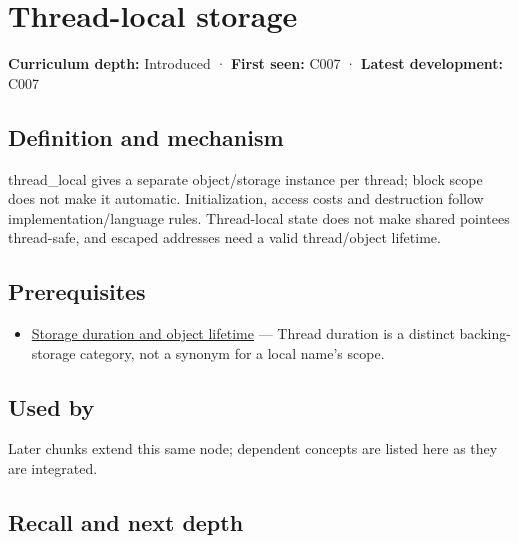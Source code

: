 \hypertarget{appendix-3b88c6cd7195}{}\label{referencestart:appendix-3b88c6cd7195}
\section{Thread-local storage}\label{appendix-3b88c6cd7195-thread-local-storage}

\textbf{Curriculum depth:} Introduced · \textbf{First seen:} C007 · \textbf{Latest development:} C007

\begin{allmightroledefinition}

\subsection{Definition and mechanism}\label{appendix-3b88c6cd7195-definition-and-mechanism}

thread\_local gives a separate object/storage instance per thread; block scope does not make it automatic. Initialization, access costs and destruction follow implementation/language rules. Thread-local state does not make shared pointees thread-safe, and escaped addresses need a valid thread/object lifetime.

\end{allmightroledefinition}

\subsection{Prerequisites}\label{appendix-3b88c6cd7195-prerequisites}

\begin{itemize}
\tightlist
\item
  \hyperref[appendix-0b104bcba06b]{Storage duration and object lifetime} --- Thread duration is a distinct backing-storage category, not a synonym for a local name's scope.
\end{itemize}

\subsection{Used by}\label{appendix-3b88c6cd7195-used-by}

Later chunks extend this same node; dependent concepts are listed here as they are integrated.

\subsection{Recall and next depth}\label{appendix-3b88c6cd7195-recall-and-next-depth}

